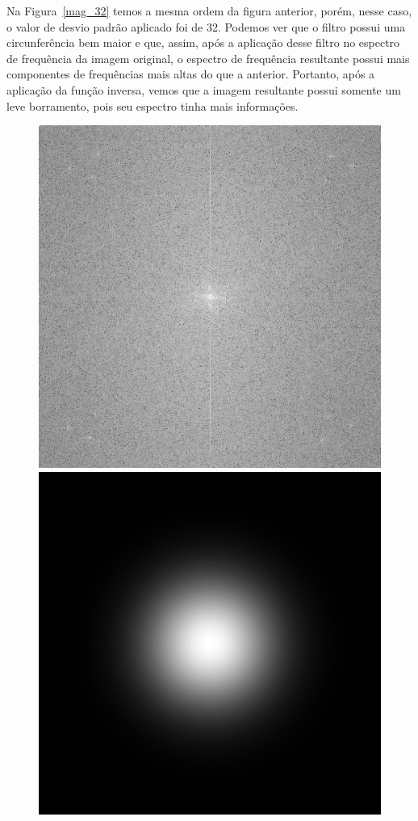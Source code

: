 \documentclass[twoside,twocolumn]{article}
\begin{document}
Na Figura~\ref{mag_32} temos a mesma ordem da figura anterior, porém, nesse caso, o valor de desvio padrão aplicado foi de 32. Podemos ver que o filtro possui uma circunferência bem maior e que, assim, após a aplicação desse filtro no espectro de frequência da imagem original, o espectro de frequência resultante possui mais componentes de frequências mais altas do que a anterior. Portanto, após a aplicação da função inversa, vemos que a imagem resultante possui somente um leve borramento, pois seu espectro tinha mais informações.

\begin{figure}[H]
\begin{center}
	\includegraphics[scale=.17]{figures/baboon_mag_spec_64.png}
	\includegraphics[scale=.17]{figures/baboon_gau_filter_64.png}

\end{center}
\end{figure}
\end{document}
